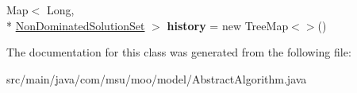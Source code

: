 \begin{DoxyCompactItemize}
\item 
\hypertarget{classcom_1_1msu_1_1moo_1_1model_1_1AbstractAlgorithm_3_01V_01extends_01IVariable_00_01P_01extends_01IProblem_01_4_aea4d1c1dd0ff1ae33abef984402d1529}{Map$<$ Long, \\*
\hyperlink{classcom_1_1msu_1_1moo_1_1model_1_1solution_1_1NonDominatedSolutionSet}{Non\-Dominated\-Solution\-Set} $>$ {\bfseries history} = new Tree\-Map$<$$>$()}\label{classcom_1_1msu_1_1moo_1_1model_1_1AbstractAlgorithm_3_01V_01extends_01IVariable_00_01P_01extends_01IProblem_01_4_aea4d1c1dd0ff1ae33abef984402d1529}

\end{DoxyCompactItemize}


The documentation for this class was generated from the following file\-:\begin{DoxyCompactItemize}
\item 
src/main/java/com/msu/moo/model/Abstract\-Algorithm.\-java\end{DoxyCompactItemize}
